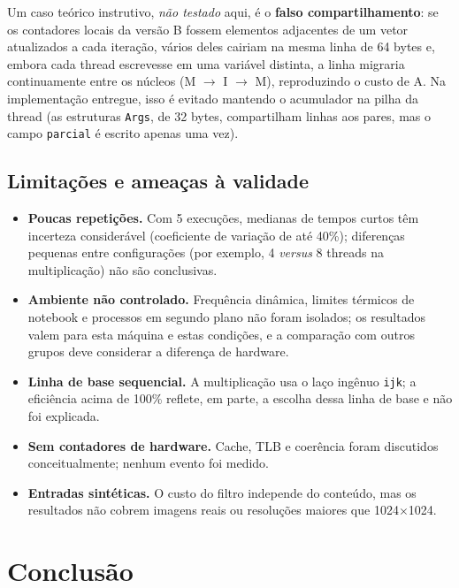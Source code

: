 \documentclass[12pt,a4paper]{article}
\newcommand{\tx}{$\times$}
\begin{document}
Um caso teórico instrutivo, \emph{não testado} aqui, é o \textbf{falso compartilhamento}: se os contadores locais da versão B fossem elementos adjacentes de um vetor atualizados a cada iteração, vários deles cairiam na mesma linha de 64 bytes e, embora cada thread escrevesse em uma variável distinta, a linha migraria continuamente entre os núcleos (M $\to$ I $\to$ M), reproduzindo o custo de A. Na implementação entregue, isso é evitado mantendo o acumulador na pilha da thread (as estruturas \texttt{Args}, de 32 bytes, compartilham linhas aos pares, mas o campo \texttt{parcial} é escrito apenas uma vez).

\subsection{Limitações e ameaças à validade}

\begin{itemize}[leftmargin=0.8cm,itemsep=0pt,topsep=0pt]
\item \textbf{Poucas repetições.} Com 5 execuções, medianas de tempos curtos têm incerteza considerável (coeficiente de variação de até 40\%); diferenças pequenas entre configurações (por exemplo, 4 \emph{versus} 8 threads na multiplicação) não são conclusivas.
\item \textbf{Ambiente não controlado.} Frequência dinâmica, limites térmicos de notebook e processos em segundo plano não foram isolados; os resultados valem para esta máquina e estas condições, e a comparação com outros grupos deve considerar a diferença de hardware.
\item \textbf{Linha de base sequencial.} A multiplicação usa o laço ingênuo \texttt{ijk}; a eficiência acima de 100\% reflete, em parte, a escolha dessa linha de base e não foi explicada.
\item \textbf{Sem contadores de hardware.} Cache, TLB e coerência foram discutidos conceitualmente; nenhum evento foi medido.
\item \textbf{Entradas sintéticas.} O custo do filtro independe do conteúdo, mas os resultados não cobrem imagens reais ou resoluções maiores que 1024\tx1024.
\end{itemize}

\section{Conclusão}
\end{document}
